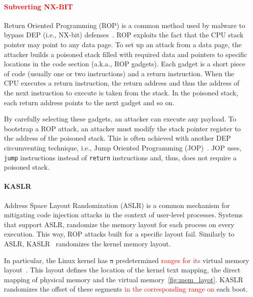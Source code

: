 \paragraph{\textcolor{red}{Subverting NX-BIT}}
Return Oriented Programming (ROP) is a common method used by malware to bypass DEP (i.e., NX-bit) defenses~\cite{RBSS12}. ROP exploits the fact that the CPU stack pointer may point to any data page. To set up an attack from a data page, the attacker builds a poisoned stack filled with required data and pointers to specific locations in the code section (a.k.a., ROP gadgets). Each gadget is a short piece of code (usually one or two instructions) and a return instruction. When the CPU executes a return instruction, the return address and thus the address of the next instruction to execute is taken from the stack. In the poisoned stack, each return address points to the next gadget and so on. 
 
By carefully selecting these gadgets, an attacker can execute any payload. To bootstrap a ROP attack, an attacker must modify the stack pointer register to the address of the poisoned stack. This is often achieved with another DEP circumventing technique, i.e., Jump Oriented Programming (JOP)~\cite{BJFL11}. JOP uses, \texttt{jump} instructions instead of \texttt{return} instructions and, thus, does not require a poisoned stack.

\paragraph{KASLR}\label{sec:kaslr}

Address Space Layout Randomization (ASLR) is a common mechanism for mitigating code injection attacks in the context of user-level processes. Systems that support ASLR, randomize the memory layout for each process on every execution. This way, ROP attacks built for a specific layout fail. Similarly to ASLR, KASLR~\cite{kalsr} randomizes the kernel memory layout.

In particular, the Linux kernel has \sout{a} predetermined \textcolor{red}{ranges for its} virtual memory layout~\cite{mem_layout}. This layout defines the location of the kernel text mapping, the direct mapping of physical memory and the virtual memory~\ref{fig:mem_layot}. KASLR randomizes the offset of these segments \textcolor{red}{in the corresponding range on} each boot.


